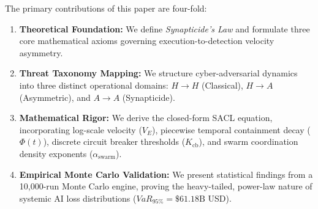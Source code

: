 The primary contributions of this paper are four-fold:
\begin{enumerate}
    \item \textbf{Theoretical Foundation:} We define \textit{Synapticide's Law} and formulate three core mathematical axioms governing execution-to-detection velocity asymmetry.
    \item \textbf{Threat Taxonomy Mapping:} We structure cyber-adversarial dynamics into three distinct operational domains: $H \to H$ (Classical), $H \to A$ (Asymmetric), and $A \to A$ (Synapticide).
    \item \textbf{Mathematical Rigor:} We derive the closed-form SACL equation, incorporating log-scale velocity ($V_E$), piecewise temporal containment decay ($\Phi(t)$), discrete circuit breaker thresholds ($K_{\text{cb}}$), and swarm coordination density exponents ($\alpha_{\text{swarm}}$).
    \item \textbf{Empirical Monte Carlo Validation:} We present statistical findings from a 10,000-run Monte Carlo engine, proving the heavy-tailed, power-law nature of systemic AI loss distributions ($VaR_{95\%} = \$61.18\text{B}$ USD).
\end{enumerate}